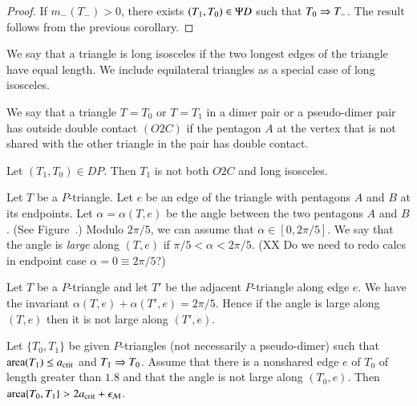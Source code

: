 \begin{proof} 
  If $m_-(T_-)>0$, there exists $(T_1,T_0)\in\Psi D$ such that $T_0\Rightarrow
  T_-$.  The result follows from the previous corollary.
\end{proof}


\begin{definition}
  We say that a triangle is long isosceles if the two longest edges of
  the triangle have equal length.  We include equilateral triangles as
  a special case of long isosceles.
\end{definition}

\begin{definition}[O2C]
  We say that a triangle $T=T_0$ or $T=T_1$ in a dimer pair or a
  pseudo-dimer pair has outside double contact $(O2C)$ if the pentagon
  $A$ at the vertex that is not shared with the other triangle in the
  pair has double contact.
\end{definition}

\begin{lemma}
  Let $(T_1,T_0)\in DP$.  Then $T_1$ is not both $O2C$ and long
  isosceles.
\end{lemma}

\begin{definition}  
  Let $T$ be a $P$-triangle.  Let $e$ be an edge of the triangle with
  pentagons $A$ and $B$ at its endpoints.  Let $\alpha = \alpha(T,e)$
  be the angle between the two pentagons $A$ and $B$.  (See
  Figure~.)  Modulo $2\pi/5$, we can assume that
  $\alpha\in [0,2\pi/5]$.  We say that the angle is {\it large} along
  $(T,e)$ if $\pi/5<\alpha < 2\pi/5$.  (XX Do we need to redo calcs in
  endpoint case $\alpha = 0 \equiv 2\pi/5$?)
\end{definition}


Let $T$ be a $P$-triangle and let $T'$ be the adjacent $P$-triangle
along edge $e$.  We have the invariant
$\alpha(T,e)+\alpha(T',e)=2\pi/5$.  Hence if the angle is large along
$(T,e)$ then it is not large along $(T',e)$.


\begin{lemma}
  Let $\{T_0,T_1\}$ be given $P$-triangles (not necessarily a
  pseudo-dimer) such that ${\operatorname{area}}(T_1)\le a_\text{crit}$ and $T_1\Rightarrow T_0$.
  Assume that there is a nonshared edge $e$ of $T_0$ of length greater
  than $1.8$ and that the angle is not large along $(T_0,e)$.  Then
  ${\operatorname{area}}\{T_0,T_1\} > 2a_\text{crit} + \epsilon_{\mathcal M}$.
\end{lemma}

